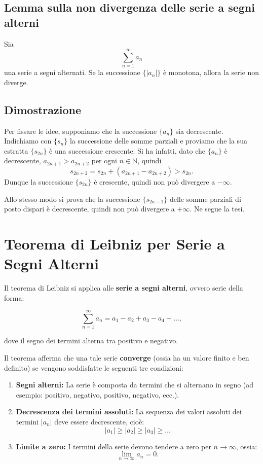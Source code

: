 \documentclass{article}
\begin{document}
\subsection*{Lemma sulla non divergenza delle serie a segni alterni}
Sia 
\[
    \sum_{n=1}^\infty a_n \tag{*}
\]
una serie a segni alternati. Se la successione \( \{ |a_n| \} \) è monotona, allora la serie non diverge.

\subsection{Dimostrazione}
Per fissare le idee, supponiamo che la successione \( \{a_n\} \) sia decrescente. Indichiamo con \( \{s_n\} \) la successione delle somme parziali e proviamo che la sua estratta \( \{s_{2n}\} \) è una successione crescente. Si ha infatti, dato che \( \{a_n\} \) è decrescente, \( a_{2n+1} > a_{2n+2} \) per ogni \( n \in \mathbb{N} \), quindi
\[
    s_{2n+2} = s_{2n} + (a_{2n+1} - a_{2n+2}) > s_{2n}.
\]
Dunque la successione \( \{s_{2n}\} \) è crescente, quindi non può divergere a \( -\infty \).

Allo stesso modo si prova che la successione \( \{s_{2n-1}\} \) delle somme parziali di posto dispari è decrescente, quindi non può divergere a \( +\infty \). Ne segue la tesi.

\section*{Teorema di Leibniz per Serie a Segni Alterni}

Il teorema di Leibniz si applica alle \textbf{serie a segni alterni}, ovvero serie della forma:

\[
\sum_{n=1}^\infty a_n = a_1 - a_2 + a_3 - a_4 + \dots,
\]

dove il segno dei termini alterna tra positivo e negativo.

Il teorema afferma che una tale serie \textbf{converge} (ossia ha un valore finito e ben definito) se vengono soddisfatte le seguenti tre condizioni:

\begin{enumerate}
    \item \textbf{Segni alterni:} La serie è composta da termini che si alternano in segno (ad esempio: positivo, negativo, positivo, negativo, ecc.).
    
    \item \textbf{Decrescenza dei termini assoluti:} La sequenza dei valori assoluti dei termini \( |a_n| \) deve essere decrescente, cioè:
    \[
    |a_1| \geq |a_2| \geq |a_3| \geq \dots
    \]
    
    \item \textbf{Limite a zero:} I termini della serie devono tendere a zero per \( n \to \infty \), ossia:
    \[
    \lim_{n \to \infty} a_n = 0.
    \]
\end{enumerate}
\bigskip
\end{document}

